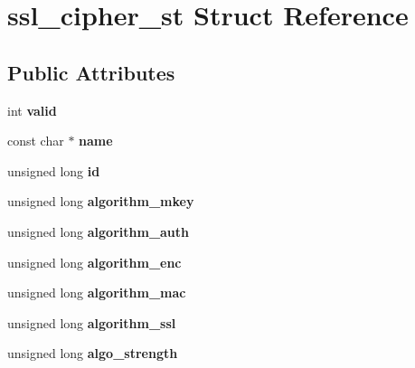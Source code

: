 \hypertarget{structssl__cipher__st}{}\section{ssl\+\_\+cipher\+\_\+st Struct Reference}
\label{structssl__cipher__st}
\subsection*{Public Attributes}
\begin{DoxyCompactItemize}
\item 
\mbox{\label{structssl__cipher__st_aaf30c2f1483a5dfcf39a507efb2bacf7}} 
int {\bfseries valid}
\item 
\mbox{\label{structssl__cipher__st_a860dfffdc51bcbb32da3a3cbae116289}} 
const char $\ast$ {\bfseries name}
\item 
\mbox{\label{structssl__cipher__st_a65f32a2ae5d5696986ecd0195eb29450}} 
unsigned long {\bfseries id}
\item 
\mbox{\label{structssl__cipher__st_ab29b842f135c00b0ae7e34fade97893f}} 
unsigned long {\bfseries algorithm\+\_\+mkey}
\item 
\mbox{\label{structssl__cipher__st_a43b013ec206a5c93d2de55b0e2848cf7}} 
unsigned long {\bfseries algorithm\+\_\+auth}
\item 
\mbox{\label{structssl__cipher__st_a3c592f9eb460fc02b91ce59485324546}} 
unsigned long {\bfseries algorithm\+\_\+enc}
\item 
\mbox{\label{structssl__cipher__st_a6de1434594cf53106b54f0368bfbcf32}} 
unsigned long {\bfseries algorithm\+\_\+mac}
\item 
\mbox{\label{structssl__cipher__st_ae343755fd0c58e74c5e03d41aaccae09}} 
unsigned long {\bfseries algorithm\+\_\+ssl}
\item 
\mbox{\label{structssl__cipher__st_a7c6a3fecb3d246870ccb803260dc2b51}} 
unsigned long {\bfseries algo\+\_\+strength}

\end{DoxyCompactItemize}
